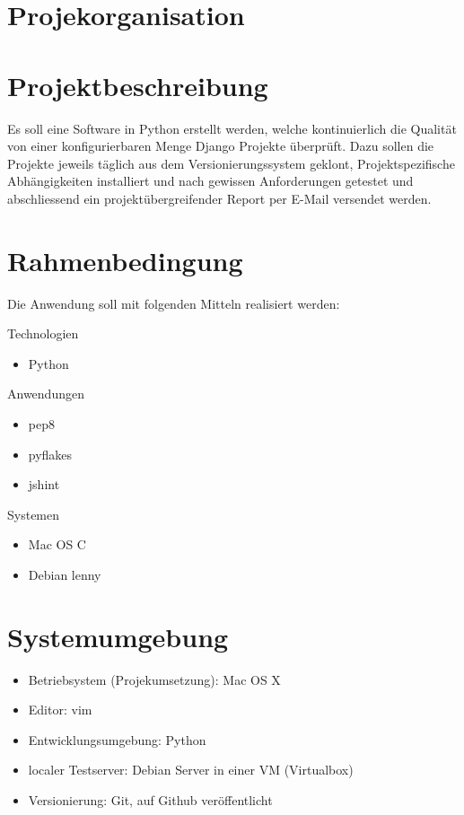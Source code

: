 \section{Projekorganisation}

\begin{figure}[!ht]
\begin{center}
\end{center}
\end{figure}

\section{Projektbeschreibung}
Es soll eine Software in Python erstellt werden, welche kontinuierlich die Qualität von einer konfigurierbaren Menge Django Projekte überprüft. Dazu sollen die Projekte jeweils täglich aus dem Versionierungssystem geklont, Projektspezifische Abhängigkeiten installiert und nach gewissen Anforderungen getestet und abschliessend ein projektübergreifender Report per E-Mail versendet werden.

\section{Rahmenbedingung}
Die Anwendung soll mit folgenden Mitteln realisiert werden:

Technologien
\begin{itemize}
    \item Python 

\end{itemize}

Anwendungen
\begin{itemize}
    \item pep8
    \item pyflakes
    \item jshint
\end{itemize}

Systemen
\begin{itemize}
    \item Mac OS C
    \item Debian lenny
\end{itemize}
    
\section{Systemumgebung}
\begin{itemize}
    \item Betriebsystem (Projekumsetzung): Mac OS X
    \item Editor: vim
    \item Entwicklungsumgebung: Python
    \item localer Testserver: Debian Server in einer VM (Virtualbox) 
    \item Versionierung: Git, auf Github veröffentlicht
\end{itemize}
\clearpage
